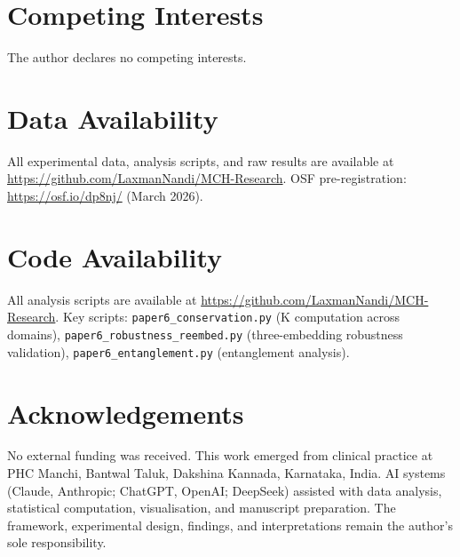 \documentclass[11pt,a4paper]{article}
\begin{document}
\section*{Competing Interests}

The author declares no competing interests.

\section*{Data Availability}

All experimental data, analysis scripts, and raw results are available at
\url{https://github.com/LaxmanNandi/MCH-Research}. OSF pre-registration:
\url{https://osf.io/dp8nj/} (March 2026).

\section*{Code Availability}

All analysis scripts are available at \url{https://github.com/LaxmanNandi/MCH-Research}.
Key scripts: \texttt{paper6\_conservation.py} (K computation across domains),
\texttt{paper6\_robustness\_reembed.py} (three-embedding robustness validation),
\texttt{paper6\_entanglement.py} (entanglement analysis).

\section*{Acknowledgements}

No external funding was received. This work emerged from clinical practice at PHC Manchi,
Bantwal Taluk, Dakshina Kannada, Karnataka, India. AI systems (Claude, Anthropic;
ChatGPT, OpenAI; DeepSeek) assisted with data analysis, statistical computation,
visualisation, and manuscript preparation. The framework, experimental design, findings,
and interpretations remain the author's sole responsibility.


\end{document}
